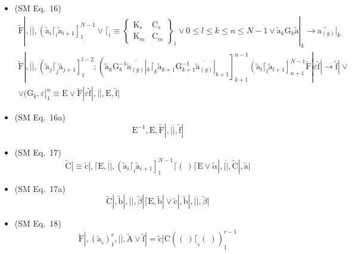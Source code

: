 \documentclass[12pt]{article}
\begin{document}
\begin{itemize}[label={},leftmargin=0pt]
    \item (SM Eq.\ 16) 
    \[
    \begin{gathered}
    \tilde{\mathrm{F}}|, \overline{||}, \left( \tilde{\mathrm{a}}_i \lceil_i \tilde{\mathrm{a}}_{i+1} \right]_{1}^{N-1} \lor \lceil_i \equiv \left\{ \begin{smallmatrix} \mathrm{K}_s & \mathrm{C}_s \\ \mathrm{K}_m & \mathrm{C}_m \end{smallmatrix} \right\}_i \lor 0 \le l \le k \le n \le N-1 \lor \tilde{\mathrm{a}}_k \mathrm{G}_k \tilde{\mathrm{a}}|_k \to \widetilde{\mathrm{a}_{(g)}}|_k \\
    \tilde{\mathrm{F}}|, \overline{||}, \left( \tilde{\mathrm{a}}_j \lceil_j \tilde{\mathrm{a}}_{j+1} \right]_{1}^{l-2} ; \left( \tilde{\mathrm{a}}_k \mathrm{G}_k^{-1} \overline{\tilde{\mathrm{a}}_{(g)}}|_k \lceil_k \tilde{\mathrm{a}}_{k+1} \mathrm{G}_{k+1}^{-1} \overline{\tilde{\mathrm{a}}_{(g)}}|_{k+1} \right]_{k+1}^{n-1} \left( \tilde{\mathrm{a}}_l \lceil_l \tilde{\mathrm{a}}_{l+1} \right]_{n+1}^{N-1} \tilde{\mathrm{F}}| \varepsilon \tilde{\mathrm{f}}| \to \tilde{\mathrm{f}}| \lor \\
    \lor (\mathrm{G}_k, \varepsilon]_1^n \equiv \mathrm{E} \lor \tilde{\mathrm{F}}| \varepsilon \tilde{\mathrm{f}}|, \overline{||}, \mathrm{E}, \tilde{\mathrm{f}}|
    \end{gathered}
    \]

    \item (SM Eq.\ 16a) 
    \[
    \mathrm{E}^{-1}, \mathrm{E}, \tilde{\mathrm{F}}|, \overline{||}, \tilde{\mathrm{f}}|
    \]

    \item (SM Eq.\ 17) 
    \[
    \tilde{\mathrm{C}}| \equiv \tilde{\mathrm{c}}|, \lceil \mathrm{E}, \overline{||}, \left( \tilde{\mathrm{a}}_i \lceil_i \tilde{\mathrm{a}}_{i+1} \right]_{1}^{N-1} \lceil (\ ) \lceil \mathrm{E} \lor \tilde{\alpha}|, \overline{||}, \tilde{\mathrm{C}}|, \tilde{\mathrm{a}}|
    \]

    \item (SM Eq.\ 17a) 
    \[
    \tilde{\mathrm{C}}|, \tilde{\mathrm{b}}|, \overline{||}, \tilde{\beta}| \lceil \mathrm{E}, \tilde{\mathrm{b}}| \lor \tilde{\mathrm{c}}|, \tilde{\mathrm{b}}|, \overline{||}, \tilde{\beta}|
    \]

    \item (SM Eq.\ 18) 
    \[
    \tilde{\mathrm{F}}|, \left( \tilde{\mathrm{a}}_\varsigma \right)_1^r, \overline{||}, \tilde{\mathrm{A}} \lor \tilde{\mathrm{f}}| = \tilde{\mathrm{c}}| \mathrm{C} \left( (\ ) \lceil_\varsigma (\ ) \right)_1^{r-1}
    \]


\end{itemize}
\end{document}
